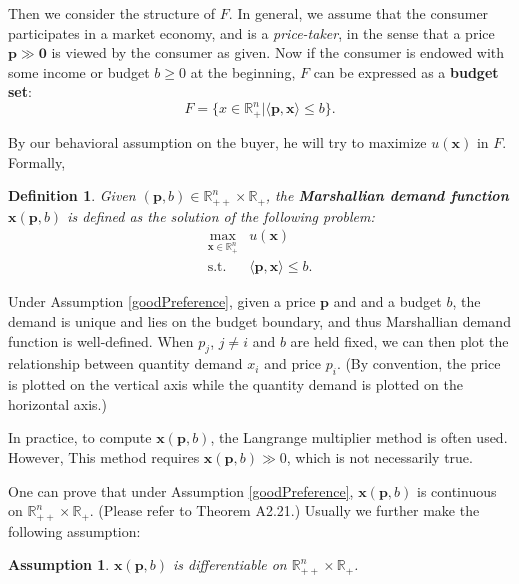\documentclass[openany]{book}
\newtheorem{definition}{Definition}[chapter]
\newtheorem{assumption}{Assumption}[chapter]
\theoremstyle{remark}
\begin{document}
Then we consider the structure of $F$. In general, we assume that the consumer participates in a market economy, and is a \textsl{price-taker}, in the sense that a price $\boldsymbol{p}\gg \mathbf{0}$ is viewed by the consumer as given. Now if the consumer is endowed with some income or budget $b\ge0$ at the beginning, $F$ can be expressed as a \textbf{budget set}:
\begin{equation}
    F=\{x\in \mathbb{R}_+^n|\langle \boldsymbol{p},\boldsymbol{x}\rangle\le b\}.
\end{equation}

By our behavioral assumption on the buyer, he will try to maximize $u(\boldsymbol{x})$ in $F$. Formally,
\begin{definition}\label{demand}
    Given $(\boldsymbol{p},b)\in \mathbb{R}_{++}^n\times \mathbb{R}_+$, the \textbf{Marshallian demand function} $\boldsymbol{x}(\boldsymbol{p},b)$ is defined as the solution of the following problem:
    \begin{equation}\label{maxUtility}
        \begin{array}{rl}
            \displaystyle\max_{\boldsymbol{x}\in \mathbb{R}_+^n} & u(\boldsymbol{x}) \\
            \mathrm{s.t.} & \langle \boldsymbol{p},\boldsymbol{x}\rangle\le b.
        \end{array}
    \end{equation}
\end{definition}
Under Assumption \ref{goodPreference}, given a price $\boldsymbol{p}$ and and a budget $b$, the demand is unique and lies on the budget boundary, and thus Marshallian demand function is well-defined. When $p_j$, $j\ne i$ and $b$ are held fixed, we can then plot the relationship between quantity demand $x_i$ and price $p_i$. (By convention, the price is plotted on the vertical axis while the quantity demand is plotted on the horizontal axis.)

In practice, to compute $\boldsymbol{x}(\boldsymbol{p},b)$, the Langrange multiplier method is often used. However, This method requires $\boldsymbol{x}(\boldsymbol{p},b)\gg0$, which is not necessarily true.

One can prove that under Assumption \ref{goodPreference}, $\boldsymbol{x}(\boldsymbol{p},b)$ is continuous on $\mathbb{R}_{++}^n\times \mathbb{R}_+$. (Please refer to \cite{J01} Theorem A2.21.) Usually we further make the following assumption:
\begin{assumption}
    $\boldsymbol{x}(\boldsymbol{p},b)$ is differentiable on $\mathbb{R}_{++}^n\times \mathbb{R}_+$.
\end{assumption}
\end{document}
